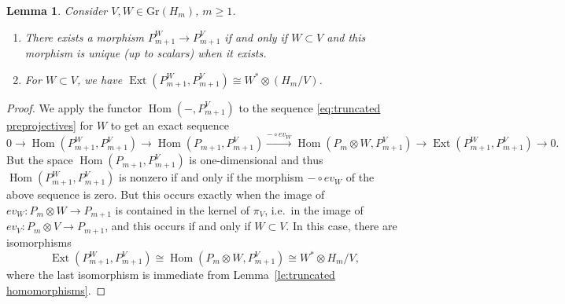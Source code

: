 \documentclass{amsart}
\newtheorem{lemma}[theorem]{Lemma}
\numberwithin{equation}{section}
\newcommand{\Ext}{\operatorname{Ext}}
\newcommand{\Gr}{\mathrm{Gr}}
\newcommand{\Hom}{\operatorname{Hom}}
\begin{document}
\begin{lemma}
  \label{le:unique morphisms}
  Consider $V,W\in \Gr(H_m)$, $m\ge1$.
  \begin{enumerate}
    \item There exists a morphism $P_{m+1}^W\to P_{m+1}^V$ if and only if $W\subset V$ and this morphism is unique (up to scalars) when it exists.
    \item For $W\subset V$, we have $\Ext(P_{m+1}^W,P_{m+1}^V)\cong W^*\otimes(H_m/V)$.
  \end{enumerate}
\end{lemma}
\begin{proof}
  We apply the functor $\Hom(-,P_{m+1}^V)$ to the sequence \eqref{eq:truncated preprojectives} for $W$ to get an exact sequence
  \[0\longrightarrow \Hom(P_{m+1}^W,P_{m+1}^V)\longrightarrow \Hom(P_{m+1},P_{m+1}^V)\stackrel{-\circ ev_W}{\longrightarrow} \Hom(P_m\otimes W,P_{m+1}^V)\longrightarrow \Ext(P_{m+1}^W,P_{m+1}^V)\longrightarrow 0.\]
  But the space $\Hom(P_{m+1},P_{m+1}^V)$ is one-dimensional and thus $\Hom(P_{m+1}^W,P_{m+1}^V)$ is nonzero if and only if the morphism $-\circ ev_W$ of the above sequence is zero.
  But this occurs exactly when the image of $ev_W:P_m\otimes W\to P_{m+1}$ is contained in the kernel of $\pi_V$, i.e.\ in the image of $ev_V:P_m\otimes V\to P_{m+1}$, and this occurs if and only if $W\subset V$. 
  In this case, there are isomorphisms
  \[\Ext(P_{m+1}^W,P_{m+1}^V)\cong\Hom(P_m\otimes W,P_{m+1}^V)\cong W^*\otimes H_m/V,\]
  where the last isomorphism is immediate from Lemma~\ref{le:truncated homomorphisms}.
\end{proof}
\end{document}
